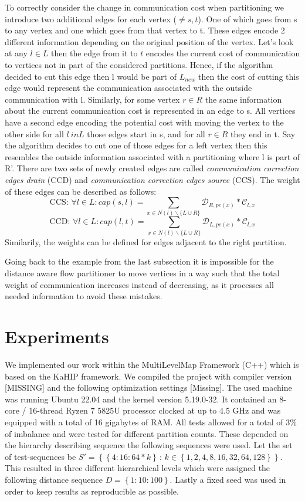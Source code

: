 \documentclass[acmsmall,nonacm,screen,review]{acmart}
\newcommand{\set}[1]{\left\{ #1\right\}}
\newcommand{\sodass}{\,:\,}
\newcommand{\setGilt}[2]{\left\{ #1\sodass #2\right\}}
\begin{document}
To correctly consider the change in communication cost when partitioning we introduce two additional edges 
for each vertex ($\neq s,t$). One of which goes from s to any vertex and one which goes from that vertex to
t. These edges encode 2 different information depending on the original position of the vertex. Let's look
at any $l\in L$ then the edge from it to $t$ encodes the current cost of communication to vertices not in
part of the considered partitions. Hence, if the algorithm decided to cut this edge then l would be part 
of $L_{new}$ then the cost of cutting this edge would represent the communication associated with the outside
communication with l. Similarly, for some vertex $r \in R$ the same information about the current communication
cost is represented in an edge to s. All vertices have a second edge encoding the potential cost with moving
the vertex to the other side for all $l \ in L$ those edges start in s, and for all $r \in R$ they end in t.
Say the algorithm decides to cut one of those edges for a left vertex then this resembles the outside information
associated with a partitioning where l is part of R'. There are two sets of newly created edges are called
\emph{communication correction edges drain} (CCD) and \emph{communication correction edges source} (CCS).
The weight of these edges can be described as follows:
$$\text{CCS: }\forall l \in L : cap(s,l) = \sum_{x\in N(l)\backslash\{L\cup R\}}\mathcal{D}_{R,pe(x)}*\mathcal{C}_{l,x}$$
$$\text{CCD: }\forall l \in L : cap(l,t) = \sum_{x\in N(l)\backslash\{L\cup R\}}\mathcal{D}_{L,pe(x)}*\mathcal{C}_{l,x}$$
Similarily, the weights can be defined for edges adjacent to the right partition.

Going back to the example from the last subsection it is impossible for the distance aware flow partitioner 
to move vertices in a way such that the total weight of communication increases instead of decreasing, as 
it processes all needed information to avoid these mistakes.

\section{Experiments}
We implemented our work within the MultiLevelMap Framework (C++) which is based on the KaHIP framework. We compiled the project
with compiler version [MISSING] and the following optimization settings [Missing]. The used machine was running Ubuntu
22.04 and the kernel version 5.19.0-32. It contained an 8-core / 16-thread Ryzen 7 5825U processor clocked at up to 4.5 GHz and 
was equipped with a total of 16 gigabytes of RAM. All tests allowed for a total of 3\% of imbalance and were tested for different
partition counts. These depended on the hierarchy describing sequence the following sequences were used.
Let the set of test-sequences be $S' = \setGilt{\set{4:16:64*k}}{k \in \set{1,2,4,8,16,32,64,128}}$. This resulted in three different
hierarchical levels which were assigned the following distance sequence $D = \set{1:10:100}$. Lastly a fixed seed was used in order to keep
results as reproducible as possible.
\end{document}
